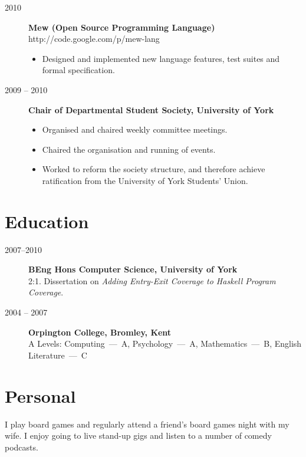 \documentclass[10pt]{report}
\begin{document}
\begin{description}
  \pagebreak[2]
  \item[2010]
    \textbf{Mew (Open Source Programming Language)} \\
    http://code.google.com/p/mew-lang
    \begin{itemize}
      \item Designed and implemented new language features, test suites and formal specification.
    \end{itemize}

  \pagebreak[2]
  \item[2009 -- 2010]
    \textbf{Chair of Departmental Student Society, University of York}
    \begin{itemize}
      \item Organised and chaired weekly committee meetings.
      \item Chaired the organisation and running of events.
      \item Worked to reform the society structure, and therefore achieve ratification from the University of York Students' Union.
    \end{itemize}
\end{description}

\section*{Education}
\begin{description}
  \item[2007--2010]
    \textbf{BEng Hons Computer Science, University of York} \\
    2:1. Dissertation on \textit{Adding Entry-Exit Coverage to Haskell Program Coverage}.

  \item [2004 -- 2007]
    \textbf{Orpington College, Bromley, Kent} \\
    A Levels: Computing~---~A, Psychology~---~A, Mathematics~---~B, English Literature~---~C
\end{description}

\section*{Personal}
I play board games and regularly attend a friend's board games night with my wife. I enjoy going to live stand-up gigs and listen to a number of comedy podcasts.
\end{document}
